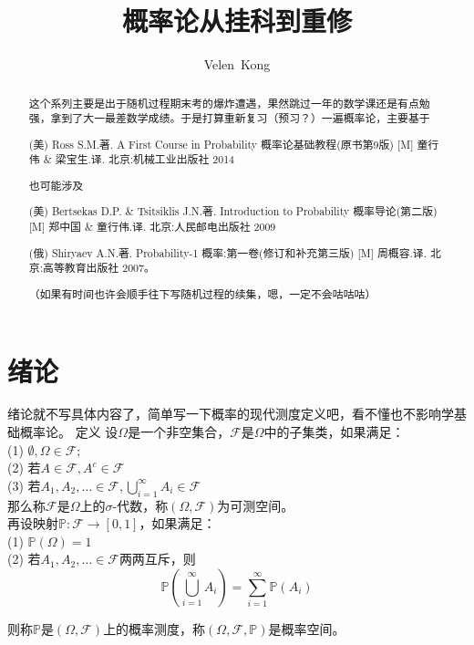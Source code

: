 \documentclass[UTF8]{ctexart}
\begin{document}
\pagestyle{headings}
\title{概率论从挂科到重修}
\author{Velen~Kong
}
\maketitle
\begin{abstract}
这个系列主要是出于随机过程期末考的爆炸遭遇，果然跳过一年的数学课还是有点勉强，拿到了大一最差数学成绩。于是打算重新复习（预习？）一遍概率论，主要基于

(美) Ross S.M.著. A First Course in Probability 概率论基础教程(原书第9版) [M] 童行伟 \& 梁宝生.译. 北京:机械工业出版社 2014

也可能涉及

(美) Bertsekas D.P. \& Tsitsiklis J.N.著. Introduction to Probability 概率导论(第二版) [M] 郑中国 \& 童行伟.译. 北京:人民邮电出版社 2009

(俄) Shiryaev A.N.著. Probability-1 概率:第一卷(修订和补充第三版) [M] 周概容.译. 北京:高等教育出版社 2007。

（如果有时间也许会顺手往下写随机过程的续集，嗯，一定不会咕咕咕）\\
\end{abstract}

\newpage

\section{绪论}
绪论就不写具体内容了，简单写一下概率的现代测度定义吧，看不懂也不影响学基础概率论。
定义 设$\Omega $是一个非空集合，$\mathcal{F}$是$\Omega $中的子集类，如果满足：\\
(1) $\emptyset ,\Omega \in \mathcal{F};$\\
(2) 若$A\in \mathcal{F},A^{c}\in \mathcal{F}$\\
(3) 若$A_{1},A_{2},\ldots \in \mathcal{F},\bigcup_{i=1}^{\infty}A_{i}\in \mathcal{F}$\\

那么称$\mathcal{F}$是$\Omega$上的$\sigma$-代数，称$(\Omega ,\mathcal{F})$为可测空间。\\

再设映射$\mathbb{P}:\mathcal{F}\to [0,1]$，如果满足：\\
(1) $\mathbb{P}(\Omega )=1$\\
(2) 若$A_{1},A_{2},\ldots \in \mathcal{F}$两两互斥，则$$\mathbb{P}(\bigcup_{i=1}^{\infty}A_{i}) = \sum_{i=1}^{\infty}\mathbb{P}(A_{i})$$

则称$\mathbb{P}$是$(\Omega ,\mathcal{F})$上的概率测度，称$(\Omega ,\mathcal{F},\mathbb{P})$是概率空间。\\
\end{document}
